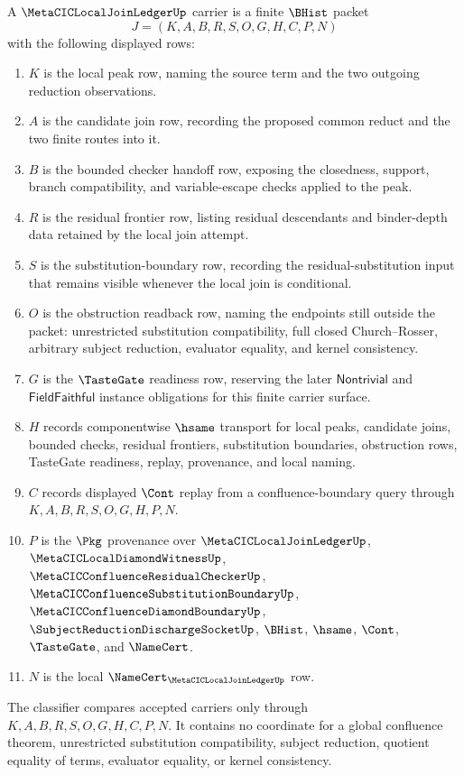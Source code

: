 \begin{definition}
\label{def:metacic-local-join-ledger-carrier}
A $\MetaCICLocalJoinLedgerUp$ carrier is a finite $\BHist$ packet
$$
J=(K,A,B,R,S,O,G,H,C,P,N)
$$
with the following displayed rows:
\begin{enumerate}
\item $K$ is the local peak row, naming the source term and the two outgoing reduction observations.
\item $A$ is the candidate join row, recording the proposed common reduct and the two finite routes into it.
\item $B$ is the bounded checker handoff row, exposing the closedness, support, branch compatibility, and variable-escape checks applied to the peak.
\item $R$ is the residual frontier row, listing residual descendants and binder-depth data retained by the local join attempt.
\item $S$ is the substitution-boundary row, recording the residual-substitution input that remains visible whenever the local join is conditional.
\item $O$ is the obstruction readback row, naming the endpoints still outside the packet: unrestricted substitution compatibility, full closed Church--Rosser, arbitrary subject reduction, evaluator equality, and kernel consistency.
\item $G$ is the $\TasteGate$ readiness row, reserving the later $\mathsf{Nontrivial}$ and $\mathsf{FieldFaithful}$ instance obligations for this finite carrier surface.
\item $H$ records componentwise $\hsame$ transport for local peaks, candidate joins, bounded checks, residual frontiers, substitution boundaries, obstruction rows, TasteGate readiness, replay, provenance, and local naming.
\item $C$ records displayed $\Cont$ replay from a confluence-boundary query through $K,A,B,R,S,O,G,H,P,N$.
\item $P$ is the $\Pkg$ provenance over $\MetaCICLocalJoinLedgerUp$, $\MetaCICLocalDiamondWitnessUp$, $\MetaCICConfluenceResidualCheckerUp$, $\MetaCICConfluenceSubstitutionBoundaryUp$, $\MetaCICConfluenceDiamondBoundaryUp$, $\SubjectReductionDischargeSocketUp$, $\BHist$, $\hsame$, $\Cont$, $\TasteGate$, and $\NameCert$.
\item $N$ is the local $\NameCert_{\MetaCICLocalJoinLedgerUp}$ row.
\end{enumerate}
The classifier compares accepted carriers only through $K,A,B,R,S,O,G,H,C,P,N$. It contains no coordinate for a global confluence theorem, unrestricted substitution compatibility, subject reduction, quotient equality of terms, evaluator equality, or kernel consistency.
\end{definition}

